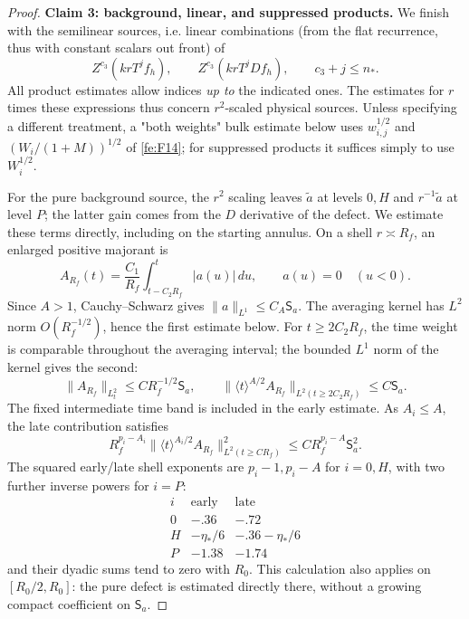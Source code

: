 \begin{proof}
\par\medskip\noindent\textbf{Claim 3: background, linear, and suppressed products.}\label{fs:claim-suppressed}\quad
We finish with the semilinear sources, i.e. linear combinations (from the flat recurrence, thus with constant scalars out front) of
\begin{equation}
\label{fs:G8}
Z^{c_3}(kr T^j f_h),\qquad Z^{c_3}(kr T^j D f_h),
                   \qquad c_3+j\le n_* .
\end{equation}
All product estimates allow indices \emph{up to} the indicated ones. The estimates for \(r\) times these expressions thus concern \(r^2\)-scaled physical sources. Unless specifying a different treatment, a "both weights" bulk estimate below uses \(w_{i,j}^{1/2}\) and \((W_i/(1+M))^{1/2}\) of \eqref{fe:F14}; for suppressed products it suffices simply to use \(W_i^{1/2}\).

For the pure background source, the $r^2$ scaling leaves
$\widetilde a$ at levels $0,H$ and $r^{-1}\widetilde a$ at level $P$;
the latter gain comes from the $D$ derivative of the defect.
We estimate these terms directly, including on the starting annulus.
On a shell $r\asymp R_f$, an enlarged positive majorant is
\begin{equation}\label{fs:acceleration-average}
 A_{R_f}(t)=\frac{C_1}{R_f}
              \int_{t-C_2R_f}^{t}|a(u)|\,du,\qquad a(u)=0\quad(u<0).
\end{equation}
Since $A>1$, Cauchy--Schwarz gives
$\|a\|_{L^1}\le C_A\mathsf S_a$.
The averaging kernel has $L^2$ norm $O(R_f^{-1/2})$, hence
the first estimate below.  For $t\ge2C_2R_f$, the time weight is
comparable throughout the averaging interval; the bounded $L^1$ norm
of the kernel gives the second:
\begin{equation}\label{fs:average-bounds}
 \|A_{R_f}\|_{L^2_t}\le C R_f^{-1/2}\mathsf S_a,
 \qquad
 \|\langle t\rangle^{A/2}A_{R_f}\|_{L^2(t\ge2C_2R_f)}
       \le C\mathsf S_a.
\end{equation}
The fixed intermediate time band is included in the early estimate.
As $A_i\le A$, the late contribution satisfies
\[
 R_f^{p_i-A_i}
 \|\langle t\rangle^{A_i/2}A_{R_f}\|_{L^2(t\ge C R_f)}^2
 \le C R_f^{p_i-A}\mathsf S_a^2 .
\]
The squared early/late shell exponents are $p_i-1,p_i-A$ for $i=0,H$,
with two further inverse powers for $i=P$:
\begin{equation}\label{fs:defect-shell-margins}
\begin{array}{c|cc}
 i&\text{early}&\text{late}\\ \hline
 0&-.36&-.72\\
 H&-\eta_*/6&-.36-\eta_*/6\\
 P&-1.38&-1.74
\end{array}
\end{equation}
and their dyadic sums tend to zero with $R_0$.
This calculation also applies on $[R_0/2,R_0]$: the pure defect is
estimated directly there, without a growing compact coefficient
on $\mathsf S_a$.


\end{proof}
